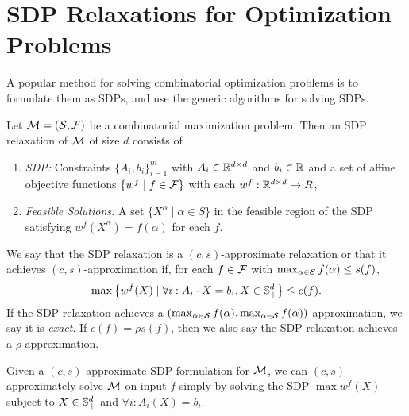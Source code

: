 \section{SDP Relaxations for Optimization Problems}\label{prelims_sdp_relaxations}
A popular method for solving combinatorial optimization problems is to formulate them as SDPs, and use the generic algorithms for solving SDPs.
\begin{definition}
Let $\mathcal M = (\mathcal S, \mathcal F)$ be a combinatorial maximization problem. Then an
  SDP relaxation of \(\mathcal M\)
  of size \(d\)
  consists of 
	\begin{enumerate}
	\item \emph{SDP:} Constraints $\{A_i, b_i\}_{i=1}^m$ with $A_i \in \mathbb R^{d \times d}$ and $b_i \in \mathbb R$ and a set of affine objective functions $\{w^f \mid f \in \mathcal F\}$ with each $w^f: \mathbb R^{d \times d} \rightarrow R$, 	
	\item \emph{Feasible Solutions:} A set $\{X^\alpha \mid \alpha \in S\}$ in the feasible region of the SDP satisfying $w^f(X^\alpha) = f(\alpha)$ for each $f$.
	\end{enumerate}
	We say that the SDP relaxation is a $(c,s)$-approximate relaxation or that it achieves $(c,s)$-approximation if, for each
	$f \in \mathcal F$ with $\max_{\alpha \in \mathcal S} f(\alpha) \leq s(f)$, 
	\[\max \left\{ w^f(X) \mid \forall i: A_i \cdot X = b_i, X \in \mathbb{S}^{d}_+\right\} \leq c(f).\]
	If the SDP relaxation achieves a $(\max_{\alpha\in \mathcal S} f(\alpha), \max_{\alpha\in \mathcal S} f(\alpha))$-approximation, we say it is \emph{exact}. If $c(f) = \rho s(f)$, then we also say the SDP relaxation achieves a $\rho$-approximation. 
\end{definition}
Given a $(c,s)$-approximate SDP formulation for $\mathcal M$, we can $(c,s)$-approximately solve $\mathcal M$ on input $f$ simply by solving
the SDP $\max w^f(X)$ subject to $X \in \mathbb{S}^{d}_+$ and $\forall i: A_i(X) = b_i$.

